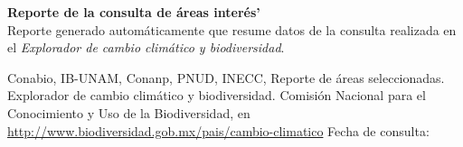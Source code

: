 \begin{titlepage}
\begin{center}
	\vspace{2.5cm}

	\textbf{Reporte de la consulta de \'areas inter\'es'} \\
	Reporte generado autom\'aticamente que resume datos de la consulta realizada en
	el \emph{Explorador de cambio clim\'atico y biodiversidad}.
	\vspace{2cm}

\end{center}









\begin{flushleft}
\small{Conabio, IB-UNAM, Conanp, PNUD, INECC, Reporte de \'areas seleccionadas. Explorador de cambio clim\'atico y biodiversidad. Comisi\'on Nacional para el Conocimiento y Uso de la Biodiversidad, en \url{http://www.biodiversidad.gob.mx/pais/cambio-climatico} Fecha de consulta: }
\bigskip
\end{flushleft}


\end{titlepage}
